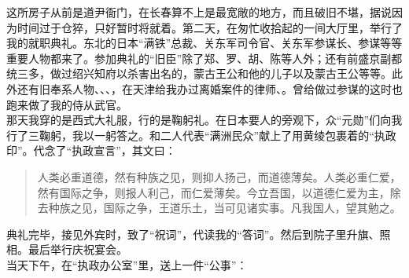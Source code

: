 这所房子从前是道尹衙门，在长春算不上是最宽敞的地方，而且破旧不堪，据说因为时间过于仓猝，只好暂时将就着。第二天，在匆忙收拾起的一间大厅里，举行了我的就职典礼。东北的日本“满铁”总裁、关东军司令官、关东军参谋长、参谋等等重要人物都来了。参加典礼的“旧臣”除了郑、罗、胡、陈等人外；还有前盛京副都统三多，做过绍兴知府以杀害出名的，蒙古王公和他的儿子以及蒙古王公等等。此外还有旧奉系人物、、、，在天津给我办过离婚案件的律师、。曾给做过参谋的这时也跑来做了我的侍从武官。\\

那天我穿的是西式大礼服，行的是鞠躬礼。在日本要人的旁观下，众“元勋”们向我行了三鞠躬，我以一躬答之。和二人代表“满洲民众”献上了用黄绫包裹着的“执政印”。代念了“执政宣言”，其文曰：\\

\begin{quote}
	人类必重道德，然有种族之见，则抑人扬己，而道德薄矣。人类必重仁爱，然有国际之争，则报人利己，而仁爱薄矣。今立吾国，以道德仁爱为主，除去种族之见，国际之争，王道乐土，当可见诸实事。凡我国人，望其勉之。\\
\end{quote}

典礼完毕，接见外宾时，致了“祝词”，代读我的“答词”。然后到院子里升旗、照相。最后举行庆祝宴会。\\

当天下午，在“执政办公室”里，送上一件“公事”：\\

